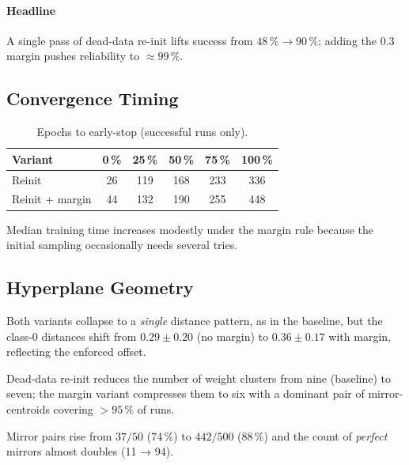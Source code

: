 \paragraph{Headline}
A single pass of dead-data re-init lifts success from
$48\,\%\!\to\!90\,\%$;
adding the $0.3$ margin pushes reliability to \(\approx99\,\%\).

\subsection*{Convergence Timing}

\begin{table}[ht]
\centering
\caption{Epochs to early-stop (successful runs only).}
\label{tab:relu1-reinit-epochs}
\begin{tabular}{lccccc}
\toprule
Variant & 0\,\% & 25\,\% & 50\,\% & 75\,\% & 100\,\% \\
\midrule
Reinit            & 26 & 119 & 168 & 233 & 336 \\
Reinit + margin   & 44 & 132 & 190 & 255 & 448 \\
\bottomrule
\end{tabular}
\end{table}

Median training time increases modestly under the margin rule because
the initial sampling occasionally needs several tries.

\subsection*{Hyperplane Geometry}

\begin{description}[leftmargin=2em]
  \item[Distance clusters] Both variants collapse to a \emph{single}
        distance pattern, as in the baseline, but the class-0 distances
        shift from \(0.29\pm0.20\) (no margin) to
        \(0.36\pm0.17\) with margin, reflecting the enforced offset.%
        
  \item[Weight clusters] Dead-data re-init reduces the number of weight
        clusters from nine (baseline) to seven; the margin variant
        compresses them to six with a dominant pair of mirror-centroids
        covering $>95\,\%$ of runs.%
  \item[Mirror symmetry] Mirror pairs rise from
        $37/50$ (74\,\%) to $442/500$ (88\,\%) and the count of
        \emph{perfect} mirrors almost doubles
        (11 → 94).%
\end{description}


